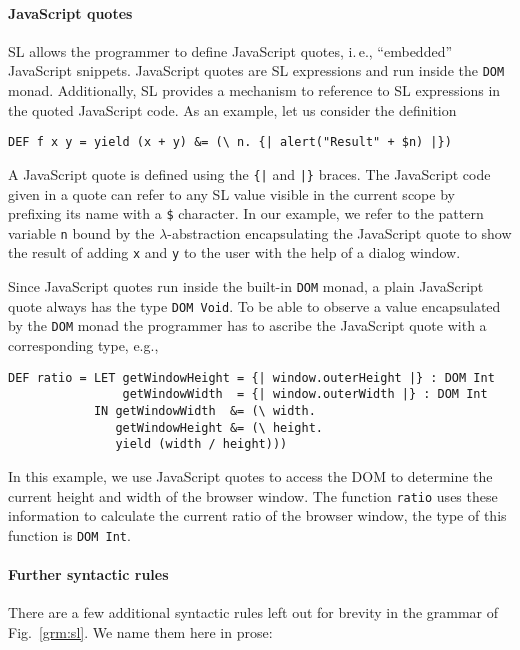 \documentclass{article}
\begin{document}
\paragraph{JavaScript quotes}
\label{sec:javascript-quotes}

SL allows the programmer to define JavaScript quotes, i.\,e.,
``embedded'' JavaScript snippets. JavaScript quotes are SL expressions
and run inside the \verb|DOM| monad. Additionally, SL provides a
mechanism to reference to SL expressions in the quoted JavaScript
code. As an example, let us consider the definition
\begin{verbatim}
DEF f x y = yield (x + y) &= (\ n. {| alert("Result" + $n) |})
\end{verbatim}
A JavaScript quote is defined using the \verb+{|+ and \verb+|}+
braces. The JavaScript code given in a quote can refer to any SL value
visible in the current scope by prefixing its name with a \verb|$|
character. In our example, we refer to the pattern variable \verb|n|
bound by the $\lambda$-abstraction encapsulating the JavaScript quote
to show the result of adding \verb|x| and \verb|y| to the user with
the help of a dialog window.

Since JavaScript quotes run inside the built-in \verb|DOM| monad, a
plain JavaScript quote always has the type \verb|DOM Void|. To be able
to observe a value encapsulated by the \verb|DOM| monad the programmer
has to ascribe the JavaScript quote with a corresponding type, e.g.,
\begin{verbatim}
DEF ratio = LET getWindowHeight = {| window.outerHeight |} : DOM Int
                getWindowWidth  = {| window.outerWidth |} : DOM Int
            IN getWindowWidth  &= (\ width.
               getWindowHeight &= (\ height.
               yield (width / height)))
\end{verbatim}
In this example, we use JavaScript quotes to access the DOM to
determine the current height and width of the browser window. The
function \verb|ratio| uses these information to calculate the current
ratio of the browser window, the type of this function is
\verb|DOM Int|.


\paragraph{Further syntactic rules}
\label{sec:furth-synt-rules}

There are a few additional syntactic rules left out for brevity in the
grammar of Fig.~\ref{grm:sl}. We name them here in prose:
\end{document}
